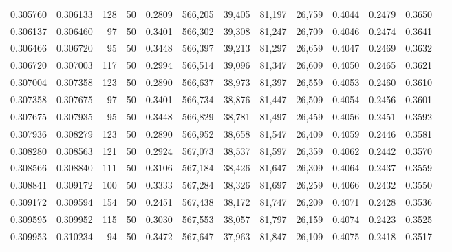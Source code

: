 \begin{tabular}{rrrrrrrrrrrrr}
0.305760 & 0.306133 &   128 &  50 &                                     0.2809 & 566,205 &  39,405 &  81,197 &  26,759 & 0.4044 & 0.2479 & 0.3650 \\
0.306137 & 0.306460 &    97 &  50 &                                     0.3401 & 566,302 &  39,308 &  81,247 &  26,709 & 0.4046 & 0.2474 & 0.3641 \\
0.306466 & 0.306720 &    95 &  50 &                                     0.3448 & 566,397 &  39,213 &  81,297 &  26,659 & 0.4047 & 0.2469 & 0.3632 \\
0.306720 & 0.307003 &   117 &  50 &                                     0.2994 & 566,514 &  39,096 &  81,347 &  26,609 & 0.4050 & 0.2465 & 0.3621 \\
0.307004 & 0.307358 &   123 &  50 &                                     0.2890 & 566,637 &  38,973 &  81,397 &  26,559 & 0.4053 & 0.2460 & 0.3610 \\
0.307358 & 0.307675 &    97 &  50 &                                     0.3401 & 566,734 &  38,876 &  81,447 &  26,509 & 0.4054 & 0.2456 & 0.3601 \\
0.307675 & 0.307935 &    95 &  50 &                                     0.3448 & 566,829 &  38,781 &  81,497 &  26,459 & 0.4056 & 0.2451 & 0.3592 \\
0.307936 & 0.308279 &   123 &  50 &                                     0.2890 & 566,952 &  38,658 &  81,547 &  26,409 & 0.4059 & 0.2446 & 0.3581 \\
0.308280 & 0.308563 &   121 &  50 &                                     0.2924 & 567,073 &  38,537 &  81,597 &  26,359 & 0.4062 & 0.2442 & 0.3570 \\
0.308566 & 0.308840 &   111 &  50 &                                     0.3106 & 567,184 &  38,426 &  81,647 &  26,309 & 0.4064 & 0.2437 & 0.3559 \\
0.308841 & 0.309172 &   100 &  50 &                                     0.3333 & 567,284 &  38,326 &  81,697 &  26,259 & 0.4066 & 0.2432 & 0.3550 \\
0.309172 & 0.309594 &   154 &  50 &                                     0.2451 & 567,438 &  38,172 &  81,747 &  26,209 & 0.4071 & 0.2428 & 0.3536 \\
0.309595 & 0.309952 &   115 &  50 &                                     0.3030 & 567,553 &  38,057 &  81,797 &  26,159 & 0.4074 & 0.2423 & 0.3525 \\
0.309953 & 0.310234 &    94 &  50 &                                     0.3472 & 567,647 &  37,963 &  81,847 &  26,109 & 0.4075 & 0.2418 & 0.3517 \\

\end{tabular}
